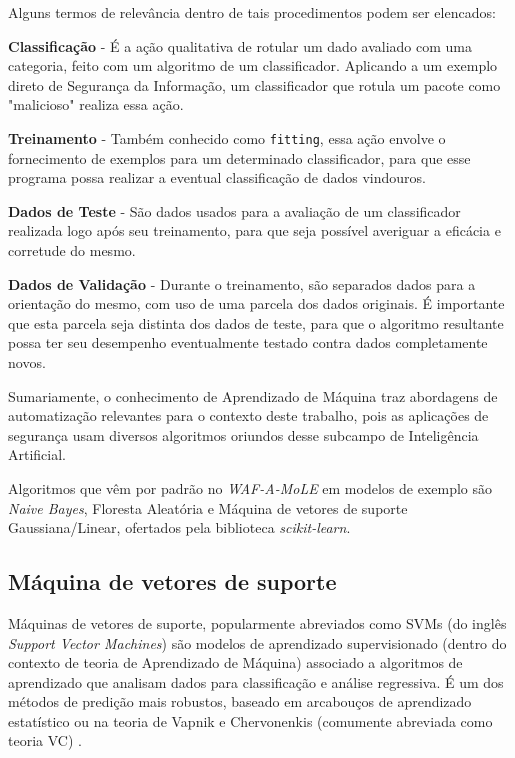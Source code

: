 Alguns termos de relevância dentro de tais procedimentos podem ser elencados:
\begin{alineas}
\item \textbf{Classificação} - É a ação qualitativa de rotular um dado avaliado com uma categoria, feito com um algoritmo de um classificador. Aplicando a um exemplo direto de Segurança da Informação, um classificador que rotula um pacote como "malicioso" realiza essa ação.
\item \textbf{Treinamento} - Também conhecido como \verb+fitting+, essa ação envolve o fornecimento de exemplos para um determinado classificador, para que esse programa possa realizar a eventual classificação de dados vindouros.
\item \textbf{Dados de Teste} - São dados usados para a avaliação de um classificador realizada logo após seu treinamento, para que seja possível averiguar a eficácia e corretude do mesmo.
\item \textbf{Dados de Validação} - Durante o treinamento, são separados dados para a orientação do mesmo, com uso de uma parcela dos dados originais. É importante que esta parcela seja distinta dos dados de teste, para que o algoritmo resultante possa ter seu desempenho eventualmente testado contra dados completamente novos.

\end{alineas}


Sumariamente, o conhecimento de Aprendizado de Máquina traz abordagens
de automatização relevantes para o contexto deste trabalho, pois as aplicações de segurança usam diversos algoritmos oriundos desse subcampo de
Inteligência Artificial.

Algoritmos que vêm por padrão no \textit{WAF-A-MoLE} em modelos de exemplo são \textit{Naive Bayes}, Floresta Aleatória e Máquina de vetores de suporte Gaussiana/Linear, ofertados pela biblioteca \textit{scikit-learn}.

\subsection{Máquina de vetores de suporte}
Máquinas de vetores de suporte, popularmente abreviados como SVMs (do inglês \textit{Support Vector Machines}) são modelos de aprendizado supervisionado (dentro do contexto de teoria de Aprendizado de Máquina) associado a algoritmos de aprendizado que analisam dados para classificação e análise regressiva. É um dos métodos de predição mais robustos, baseado em arcabouços de aprendizado estatístico ou na teoria de Vapnik e Chervonenkis (comumente abreviada como teoria VC) \cite{ben2001_vapnik_support}.

